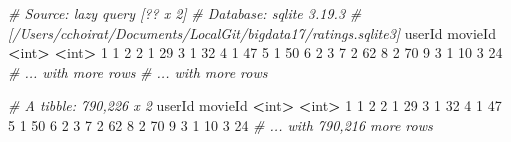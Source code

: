 \documentclass[]{book}
\newenvironment{Shaded}{\begin{snugshade}}{\end{snugshade}}
\newcommand{\KeywordTok}[1]{\textcolor[rgb]{0.13,0.29,0.53}{\textbf{#1}}}
\newcommand{\DecValTok}[1]{\textcolor[rgb]{0.00,0.00,0.81}{#1}}
\newcommand{\StringTok}[1]{\textcolor[rgb]{0.31,0.60,0.02}{#1}}
\newcommand{\CommentTok}[1]{\textcolor[rgb]{0.56,0.35,0.01}{\textit{#1}}}
\newcommand{\OperatorTok}[1]{\textcolor[rgb]{0.81,0.36,0.00}{\textbf{#1}}}
\newcommand{\ErrorTok}[1]{\textcolor[rgb]{0.64,0.00,0.00}{\textbf{#1}}}
\newcommand{\NormalTok}[1]{#1}
\theoremstyle{definition}
\theoremstyle{definition}
\theoremstyle{definition}
\theoremstyle{remark}
\begin{document}
\begin{Shaded}
\begin{Highlighting}[]
\CommentTok{# Source:   lazy query [?? x 2]}
\CommentTok{# Database: sqlite 3.19.3}
\CommentTok{#   [/Users/cchoirat/Documents/LocalGit/bigdata17/ratings.sqlite3]}
\NormalTok{   userId movieId}
    \OperatorTok{<}\NormalTok{int}\OperatorTok{>}\StringTok{   }\ErrorTok{<}\NormalTok{int}\OperatorTok{>}
\StringTok{ }\DecValTok{1}      \DecValTok{1}       \DecValTok{2}
 \DecValTok{2}      \DecValTok{1}      \DecValTok{29}
 \DecValTok{3}      \DecValTok{1}      \DecValTok{32}
 \DecValTok{4}      \DecValTok{1}      \DecValTok{47}
 \DecValTok{5}      \DecValTok{1}      \DecValTok{50}
 \DecValTok{6}      \DecValTok{2}       \DecValTok{3}
 \DecValTok{7}      \DecValTok{2}      \DecValTok{62}
 \DecValTok{8}      \DecValTok{2}      \DecValTok{70}
 \DecValTok{9}      \DecValTok{3}       \DecValTok{1}
\DecValTok{10}      \DecValTok{3}      \DecValTok{24}
\CommentTok{# ... with more rows}
\CommentTok{# ... with more rows}
\end{Highlighting}
\end{Shaded}

\begin{Shaded}
\end{Shaded}

\begin{Shaded}
\begin{Highlighting}[]
\CommentTok{# A tibble: 790,226 x 2}
\NormalTok{   userId movieId}
    \OperatorTok{<}\NormalTok{int}\OperatorTok{>}\StringTok{   }\ErrorTok{<}\NormalTok{int}\OperatorTok{>}
\StringTok{ }\DecValTok{1}      \DecValTok{1}       \DecValTok{2}
 \DecValTok{2}      \DecValTok{1}      \DecValTok{29}
 \DecValTok{3}      \DecValTok{1}      \DecValTok{32}
 \DecValTok{4}      \DecValTok{1}      \DecValTok{47}
 \DecValTok{5}      \DecValTok{1}      \DecValTok{50}
 \DecValTok{6}      \DecValTok{2}       \DecValTok{3}
 \DecValTok{7}      \DecValTok{2}      \DecValTok{62}
 \DecValTok{8}      \DecValTok{2}      \DecValTok{70}
 \DecValTok{9}      \DecValTok{3}       \DecValTok{1}
\DecValTok{10}      \DecValTok{3}      \DecValTok{24}
\CommentTok{# ... with 790,216 more rows}
\end{Highlighting}
\end{Shaded}
\end{document}
